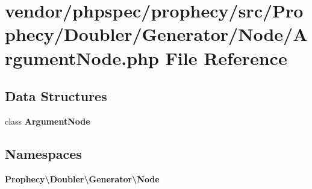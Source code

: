\section{vendor/phpspec/prophecy/src/\+Prophecy/\+Doubler/\+Generator/\+Node/\+Argument\+Node.php File Reference}
\label{_argument_node_8php}
\subsection*{Data Structures}
\begin{DoxyCompactItemize}
\item 
class {\bf Argument\+Node}
\end{DoxyCompactItemize}
\subsection*{Namespaces}
\begin{DoxyCompactItemize}
\item 
 {\bf Prophecy\textbackslash{}\+Doubler\textbackslash{}\+Generator\textbackslash{}\+Node}
\end{DoxyCompactItemize}

